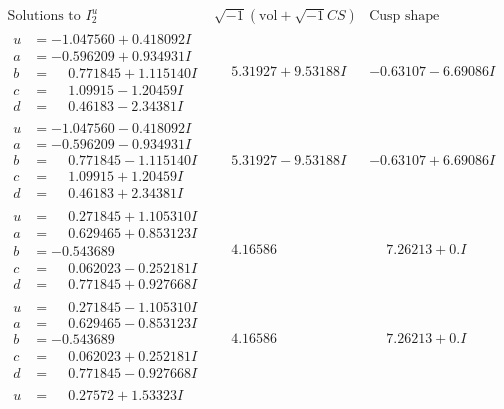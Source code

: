 \documentclass[1p]{elsarticle_modified}
\theoremstyle{definition}
\newcommand{\I}{\sqrt{-1}}
\begin{document}
$$\begin{array}{c|c|c}  
\text{Solutions to }I^u_{2}& \I (\text{vol} + \sqrt{-1}CS) & \text{Cusp shape}\\
 \hline 
\begin{aligned}
u &= -1.047560 + 0.418092 I \\
a &= -0.596209 + 0.934931 I \\
b &= \phantom{-}0.771845 + 1.115140 I \\
c &= \phantom{-}1.09915 - 1.20459 I \\
d &= \phantom{-}0.46183 - 2.34381 I\end{aligned}
 & \phantom{-}5.31927 + 9.53188 I & -0.63107 - 6.69086 I \\ \hline\begin{aligned}
u &= -1.047560 - 0.418092 I \\
a &= -0.596209 - 0.934931 I \\
b &= \phantom{-}0.771845 - 1.115140 I \\
c &= \phantom{-}1.09915 + 1.20459 I \\
d &= \phantom{-}0.46183 + 2.34381 I\end{aligned}
 & \phantom{-}5.31927 - 9.53188 I & -0.63107 + 6.69086 I \\ \hline\begin{aligned}
u &= \phantom{-}0.271845 + 1.105310 I \\
a &= \phantom{-}0.629465 + 0.853123 I \\
b &= -0.543689\phantom{ +0.000000I} \\
c &= \phantom{-}0.062023 - 0.252181 I \\
d &= \phantom{-}0.771845 + 0.927668 I\end{aligned}
 & \phantom{-}4.16586\phantom{ +0.000000I} & \phantom{-}7.26213 + 0. I\phantom{ +0.000000I} \\ \hline\begin{aligned}
u &= \phantom{-}0.271845 - 1.105310 I \\
a &= \phantom{-}0.629465 - 0.853123 I \\
b &= -0.543689\phantom{ +0.000000I} \\
c &= \phantom{-}0.062023 + 0.252181 I \\
d &= \phantom{-}0.771845 - 0.927668 I\end{aligned}
 & \phantom{-}4.16586\phantom{ +0.000000I} & \phantom{-}7.26213 + 0. I\phantom{ +0.000000I} \\ \hline\begin{aligned}
u &= \phantom{-}0.27572 + 1.53323 I \\

\end{aligned}
\end{array}$$
\end{document}
